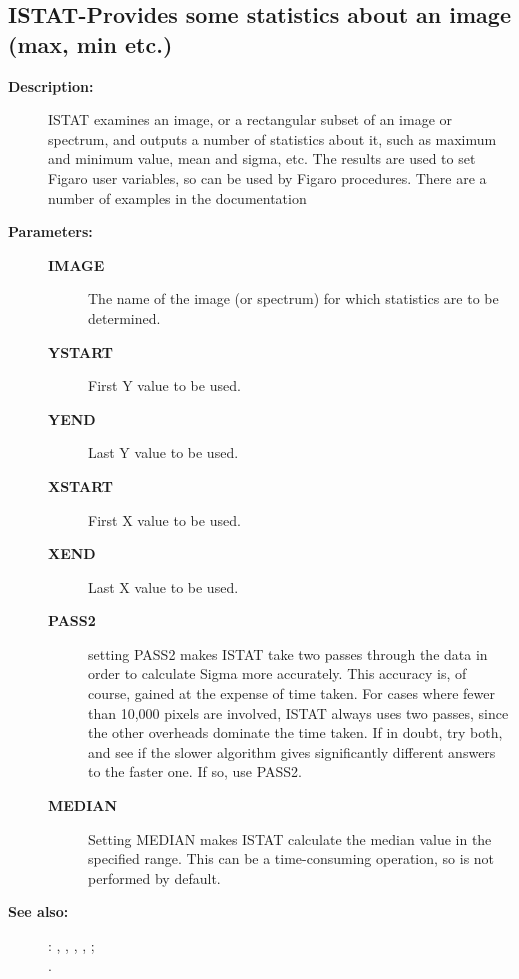 \subsection{ISTAT-\label{ISTAT}Provides some statistics about an image (max, min etc.)}
\begin{description}

\item [{\bf Description:}]
 ISTAT examines an image, or a rectangular subset of an image or
 spectrum, and outputs a number of statistics about it, such as
 maximum and minimum value, mean and sigma, etc.  The results
 are used to set Figaro user variables, so can be used by Figaro
 procedures.  There are a number of examples in the documentation

\item [{\bf Parameters:}]
\begin{description}
\item [{\bf IMAGE}]
 The name of the image (or spectrum) for
 which statistics are to be determined.
\item [{\bf YSTART}]
 First Y value to be used.
\item [{\bf YEND}]
 Last Y value to be used.
\item [{\bf XSTART}]
 First X value to be used.
\item [{\bf XEND}]
 Last X value to be used.
\item [{\bf PASS2}]
 setting PASS2 makes ISTAT take two passes through the
 data in order to calculate Sigma more accurately.  This
 accuracy is, of course, gained at the expense of time
 taken.  For cases where fewer than 10,000 pixels are
 involved, ISTAT always uses two passes, since the other
 overheads dominate the time taken.  If in doubt, try
 both, and see if the slower algorithm gives significantly
 different answers to the faster one.  If so, use PASS2.
\item [{\bf MEDIAN}]
 Setting MEDIAN makes ISTAT calculate the median value
 in the specified range.  This can be a time-consuming
 operation, so is not performed by default.
\end{description}

\item [{\bf See also:}]
: , , , , ;\\
.\\


\end{description}
